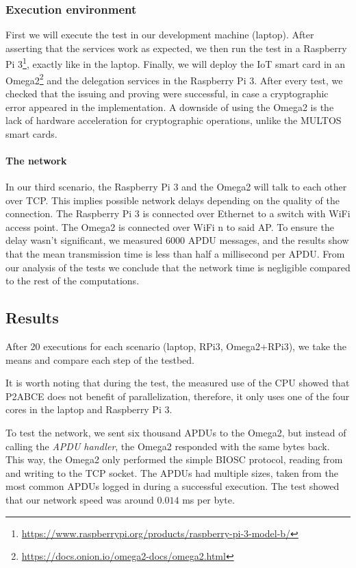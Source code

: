 \documentclass[journal]{IEEEtran}
\begin{document}
\hfil

\subsubsection{Execution environment}

First we will execute the test in our development machine (laptop). After asserting that the services work as expected, we then run the test in a Raspberry Pi 3\footnote{\url{https://www.raspberrypi.org/products/raspberry-pi-3-model-b/}}, exactly like in the laptop. Finally, we will deploy the IoT smart card in an Omega2\footnote{\url{https://docs.onion.io/omega2-docs/omega2.html}} and the delegation services in the Raspberry Pi 3. After every test, we checked that the issuing and proving were successful, in case a cryptographic error appeared in the implementation.
A downside of using the Omega2 is the lack of hardware acceleration for cryptographic operations, unlike the MULTOS smart cards.



\paragraph{The network} In our third scenario, the Raspberry Pi 3 and the Omega2 will talk to each other over TCP. This implies possible network delays depending on the quality of the connection. The Raspberry Pi 3 is connected over Ethernet to a switch with WiFi access point. The Omega2 is connected over WiFi n to said AP. To ensure the delay wasn't significant, we measured 6000 APDU messages, and the results show that the mean transmission time is less than half a millisecond per APDU. From our analysis of the tests we conclude that the network time is negligible compared to the rest of the computations.



\subsection{Results}

After 20 executions for each scenario (laptop, RPi3, Omega2+RPi3), we take the means and compare each step of the testbed.

It is worth noting that during the test, the measured use of the CPU showed that P2ABCE does not benefit of parallelization, therefore, it only uses one of the four cores in the laptop and Raspberry Pi 3.

To test the network, we sent six thousand APDUs to the Omega2, but instead of calling the \textit{APDU handler}, the Omega2 responded with the same bytes back. This way, the Omega2 only performed the simple BIOSC protocol, reading from and writing to the TCP socket.
The APDUs had multiple sizes, taken from the most common APDUs logged in during a successful execution. The test showed that our network speed was around $0.014$ ms per byte.
\end{document}

